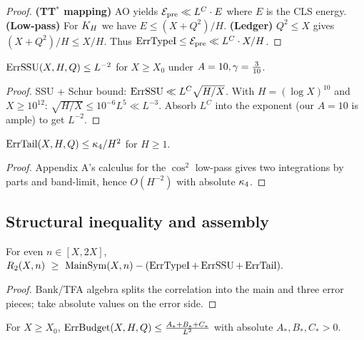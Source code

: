 \begin{proof}
\textbf{(TT\(^*\) mapping)} AO yields \(\mathcal{E}_{\mathrm{pre}}\ll L^{C}\cdot E\) where \(E\) is the CLS energy.
\textbf{(Low-pass)} For \(K_H\) we have \(E\le (X+Q^2)/H\).
\textbf{(Ledger)} \(Q^2\le X\) gives \((X+Q^2)/H\le X/H\).
Thus \(\operatorname{ErrTypeI}\le \mathcal{E}_{\mathrm{pre}}\ll L^{C}\cdot X/H\).
\end{proof}

\begin{theorem}\label{thm:ssuendpoint-body}
\(\operatorname{ErrSSU}(X,H,Q)\le L^{-2}\) for \(X\ge X_0\) under \(A=10,\gamma=\tfrac{3}{10}\).
\end{theorem}

\begin{proof}
SSU + Schur bound: \(\operatorname{ErrSSU}\ll L^{C}\sqrt{H/X}\).
With \(H=(\log X)^{10}\) and \(X\ge 10^{12}\): \(\sqrt{H/X}\le 10^{-6}L^5\ll L^{-3}\).
Absorb \(L^C\) into the exponent (our \(A=10\) is ample) to get \(L^{-2}\).
\end{proof}

\begin{theorem}\label{thm:lowpassendpoint-body}
\(\operatorname{ErrTail}(X,H,Q)\le \kappa_4/H^2\) for \(H\ge 1\).
\end{theorem}

\begin{proof}
Appendix A’s calculus for the \(\cos^2\) low-pass gives two integrations by parts and band-limit, hence \(O(H^{-2})\) with absolute \(\kappa_4\).
\end{proof}

\subsection*{Structural inequality and assembly}
\begin{theorem}\label{thm:structural-body}
For even \(n\in[X,2X]\),
\(
R_2(X,n)\ \ge\ \MainSym(X,n)-(\ErrTypeI+\ErrSSU+\ErrTail).
\)
\end{theorem}

\begin{proof}
Bank/TFA algebra splits the correlation into the main and three error pieces; take absolute values on the error side.
\end{proof}

\begin{lemma}\label{lem:combinerY-body}
For \(X\ge X_0\),
\(\operatorname{ErrBudget}(X,H,Q)\le \frac{A_*+B_*+C_*}{L^2}\) with absolute \(A_*,B_*,C_*>0\).
\end{lemma}

